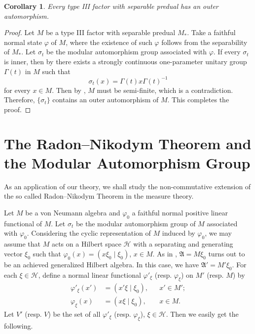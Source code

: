 \documentclass[12pt,b5paper,twoside]{article}
\theoremstyle{takesaki}
\newtheorem{corollary}{Corollary}[section]
\numberwithin{equation}{section}
\begin{document}
\begin{corollary}\label{cor:14.3}
Every type III factor with separable predual has an outer
automorphism.
\end{corollary}

\begin{proof}
Let $M$ be a type III factor with separable predual $M_*$.  Take a
faithful normal state $\varphi$ of $M$, where the existence of such
$\varphi$ follows from the separability of $M_*$.  Let $\sigma_t$ be
the modular automorphism group associated with $\varphi$.  If every
$\sigma_t$ is inner, then by \cite[Theorem~4.13]{ref24} there exists a
strongly continuous one-parameter unitary group $\Gamma(t)$ in $M$
such that
\[
 \sigma_t(x)=\Gamma(t)x\Gamma(t)^{-1}
\]
for every $x\in M$.  Then by , $M$ must be semi-finite,
which is a contradiction.  Therefore, $\{\sigma_t\}$ contains an
outer automorphism of $M$.  This completes the proof.
\end{proof}

\section{The \texorpdfstring{Radon--Nikodym}{Radon-Nikodym} Theorem and the Modular Automorphism Group}
\label{sec:15}

As an application of our theory, we shall study the non-commutative
extension of the so called Radon--Nikodym Theorem in the measure theory.

Let $M$ be a von Neumann algebra and $\varphi _0$ a faithful normal
positive linear functional of $M$.  Let $\sigma_t$ be the modular
automorphism group of $M$ associated with $\varphi _0$.  Considering the
cyclic representation of $M$ induced by $\varphi _0$, we may assume that
$M$ acts on a Hilbert space $\mathcal H$ with a separating and generating
vector $\xi _0$ such that
$\varphi _0(x)=(x\xi _0\mid\xi _0)$, $x\in M$.  As in
, $\mathfrak A=M\xi _0$ turns out to be an achieved
generalized Hilbert algebra.  In this case, we have
$\mathfrak A'=M'\xi _0$.  For each $\xi\in\mathcal H$, define a normal
linear functional $\varphi'_{\xi}$ (resp. $\varphi_{\xi}$) on $M'$
(resp. $M$) by
\begin{equation}
  \begin{aligned}
    \varphi'_{\xi}(x')&=(x'\xi\mid\xi _0), &&x'\in M';\\
    \varphi_{\xi}(x)&=(x\xi\mid\xi _0), &&x\in M.
  \end{aligned}
  \label{eq:15.1}
\end{equation}
Let $V'$ (resp. $V$) be the set of all $\varphi'_{\xi}$
(resp. $\varphi_{\xi}$), $\xi\in\mathcal H$.  Then we easily get the
following.
\end{document}
